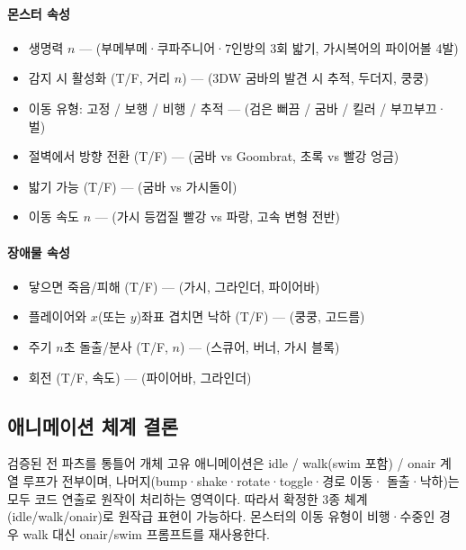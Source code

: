 \documentclass[10pt,a4paper]{article}
\begin{document}
\paragraph{몬스터 속성}
\begin{itemize}
  \item 생명력 $n$ --- (부메부메·쿠파주니어·7인방의 3회 밟기, 가시복어의 파이어볼 4발)
  \item 감지 시 활성화 (T/F, 거리 $n$) --- (3DW 굼바의 발견 시 추적, 두더지, 쿵쿵)
  \item 이동 유형: 고정 / 보행 / 비행 / 추적 --- (검은 뻐끔 / 굼바 / 킬러 / 부끄부끄·벌)
  \item 절벽에서 방향 전환 (T/F) --- (굼바 vs Goombrat, 초록 vs 빨강 엉금)
  \item 밟기 가능 (T/F) --- (굼바 vs 가시돌이)
  \item 이동 속도 $n$ --- (가시 등껍질 빨강 vs 파랑, 고속 변형 전반)
\end{itemize}

\paragraph{장애물 속성}
\begin{itemize}
  \item 닿으면 죽음/피해 (T/F) --- (가시, 그라인더, 파이어바)
  \item 플레이어와 $x$(또는 $y$)좌표 겹치면 낙하 (T/F) --- (쿵쿵, 고드름)
  \item 주기 $n$초 돌출/분사 (T/F, $n$) --- (스큐어, 버너, 가시 블록)
  \item 회전 (T/F, 속도) --- (파이어바, 그라인더)
\end{itemize}

\subsection{애니메이션 체계 결론}

검증된 전 파츠를 통틀어 개체 고유 애니메이션은 idle / walk(swim 포함) /
onair 계열 루프가 전부이며, 나머지(bump·shake·rotate·toggle·경로 이동·
돌출·낙하)는 모두 코드 연출로 원작이 처리하는 영역이다. 따라서 확정한
3종 체계(idle/walk/onair)로 원작급 표현이 가능하다. 몬스터의 이동 유형이
비행·수중인 경우 walk 대신 onair/swim 프롬프트를 재사용한다.
\end{document}
